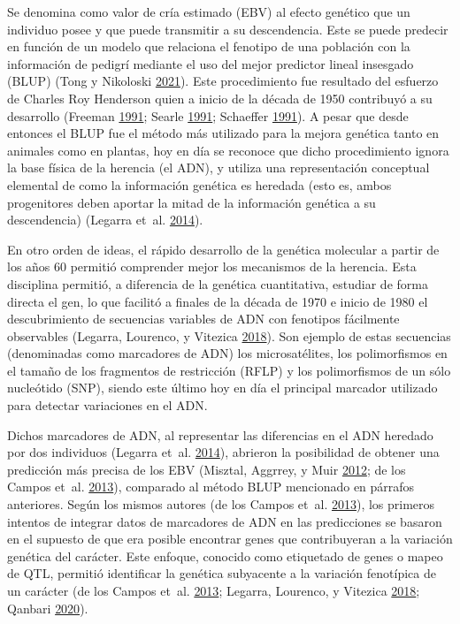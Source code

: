 \documentclass[11pt,spanish,a4paper,oneside,]{book} %
\begin{document}
Se denomina como valor de cría estimado (EBV) al efecto genético que un individuo posee y que puede transmitir a su descendencia. Este se puede predecir en función de un modelo que relaciona el fenotipo de una población con la información de pedigrí mediante el uso del mejor predictor lineal insesgado (BLUP) (Tong y Nikoloski \protect\hyperlink{ref-cite:7}{2021}). Este procedimiento fue resultado del esfuerzo de Charles Roy Henderson quien a inicio de la década de 1950 contribuyó a su desarrollo (Freeman \protect\hyperlink{ref-cite:28}{1991}; Searle \protect\hyperlink{ref-cite:29}{1991}; Schaeffer \protect\hyperlink{ref-cite:27}{1991}). A pesar que desde entonces el BLUP fue el método más utilizado para la mejora genética tanto en animales como en plantas, hoy en día se reconoce que dicho procedimiento ignora la base física de la herencia (el ADN), y utiliza una representación conceptual elemental de como la información genética es heredada (esto es, ambos progenitores deben aportar la mitad de la información genética a su descendencia) (Legarra et~al. \protect\hyperlink{ref-cite:15}{2014}).

En otro orden de ideas, el rápido desarrollo de la genética molecular a partir de los años 60 permitió comprender mejor los mecanismos de la herencia. Esta disciplina permitió, a diferencia de la genética cuantitativa, estudiar de forma directa el gen, lo que facilitó a finales de la década de 1970 e inicio de 1980 el descubrimiento de secuencias variables de ADN con fenotipos fácilmente observables (Legarra, Lourenco, y Vitezica \protect\hyperlink{ref-cite:30}{2018}). Son ejemplo de estas secuencias (denominadas como marcadores de ADN) los microsatélites, los polimorfismos en el tamaño de los fragmentos de restricción (RFLP) y los polimorfismos de un sólo nucleótido (SNP), siendo este último hoy en día el principal marcador utilizado para detectar variaciones en el ADN.

Dichos marcadores de ADN, al representar las diferencias en el ADN heredado por dos individuos (Legarra et~al. \protect\hyperlink{ref-cite:15}{2014}), abrieron la posibilidad de obtener una predicción más precisa de los EBV (Misztal, Aggrrey, y Muir \protect\hyperlink{ref-cite:14}{2012}; de los Campos et~al. \protect\hyperlink{ref-cite:31}{2013}), comparado al método BLUP mencionado en párrafos anteriores. Según los mismos autores (de los Campos et~al. \protect\hyperlink{ref-cite:31}{2013}), los primeros intentos de integrar datos de marcadores de ADN en las predicciones se basaron en el supuesto de que era posible encontrar genes que contribuyeran a la variación genética del carácter. Este enfoque, conocido como etiquetado de genes o mapeo de QTL, permitió identificar la genética subyacente a la variación fenotípica de un carácter (de los Campos et~al. \protect\hyperlink{ref-cite:31}{2013}; Legarra, Lourenco, y Vitezica \protect\hyperlink{ref-cite:30}{2018}; Qanbari \protect\hyperlink{ref-cite:36}{2020}).
\end{document}
